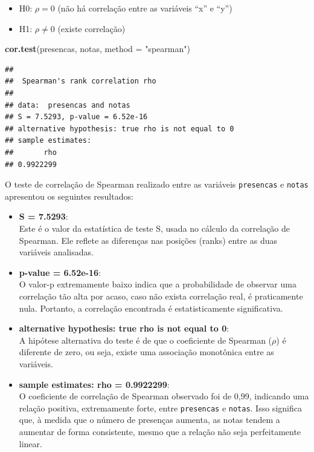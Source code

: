 \documentclass[
]{book}
\newenvironment{Shaded}{\begin{snugshade}}{\end{snugshade}}
\newcommand{\AttributeTok}[1]{\textcolor[rgb]{0.13,0.29,0.53}{#1}}
\newcommand{\FunctionTok}[1]{\textcolor[rgb]{0.13,0.29,0.53}{\textbf{#1}}}
\newcommand{\NormalTok}[1]{#1}
\newcommand{\StringTok}[1]{\textcolor[rgb]{0.31,0.60,0.02}{#1}}
\providecommand{\tightlist}{%
  \setlength{\itemsep}{0pt}\setlength{\parskip}{0pt}}
\begin{document}
\begin{itemize}
\tightlist
\item
  H0: \(\rho = 0\) (não há correlação entre as variáveis ``x'' e ``y'')
\item
  H1: \(\rho \neq 0\) (existe correlação)
\end{itemize}

\begin{Shaded}
\begin{Highlighting}[]
\FunctionTok{cor.test}\NormalTok{(presencas, notas, }\AttributeTok{method =} \StringTok{"spearman"}\NormalTok{)}
\end{Highlighting}
\end{Shaded}

\begin{verbatim}
## 
##  Spearman's rank correlation rho
## 
## data:  presencas and notas
## S = 7.5293, p-value = 6.52e-16
## alternative hypothesis: true rho is not equal to 0
## sample estimates:
##       rho 
## 0.9922299
\end{verbatim}

O teste de correlação de Spearman realizado entre as variáveis \texttt{presencas} e \texttt{notas} apresentou os seguintes resultados:

\begin{itemize}
\item
  \textbf{S = 7.5293}:\\
  Este é o valor da estatística de teste S, usada no cálculo da correlação de Spearman. Ele reflete as diferenças nas posições (ranks) entre as duas variáveis analisadas.
\item
  \textbf{p-value = 6.52e-16}:\\
  O valor-p extremamente baixo indica que a probabilidade de observar uma correlação tão alta por acaso, caso não exista correlação real, é praticamente nula. Portanto, a correlação encontrada é estatisticamente significativa.
\item
  \textbf{alternative hypothesis: true rho is not equal to 0}:\\
  A hipótese alternativa do teste é de que o coeficiente de Spearman (\(\rho\)) é diferente de zero, ou seja, existe uma associação monotônica entre as variáveis.
\item
  \textbf{sample estimates: rho = 0.9922299}:\\
  O coeficiente de correlação de Spearman observado foi de 0,99, indicando uma relação positiva, extremamente forte, entre \texttt{presencas} e \texttt{notas}. Isso significa que, à medida que o número de presenças aumenta, as notas tendem a aumentar de forma consistente, mesmo que a relação não seja perfeitamente linear.
\end{itemize}
\end{document}
